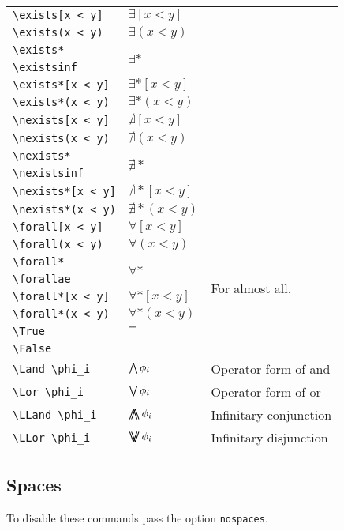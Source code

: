 \documentclass[leqno,11pt]{amsart}
\newcommand{\tab}{\hspace{1cm}}
\begin{document}
\begin{tabular}{l |  l | l}\toprule
	\verb=\exists[x < y]=		& \( \exists[x < y ] \) & \\[6pt]
	\verb=\exists(x < y)=		& \( \exists(x < y ) \) & \\ \midrule
	\verb=\exists*=		& \multirow{2}{*}{\( \exists* \)} & \\[6pt]
	\tab \verb=\existsinf=	&				  & \\[6pt]
	\verb=\exists*[x < y]=		& \( \exists*[x < y ] \) & \\[6pt]
	\verb=\exists*(x < y)=		& \( \exists*(x < y ) \) & \\ \midrule
	\verb=\nexists[x < y]=		& \( \nexists[x < y ] \) & \\[6pt]
	\verb=\nexists(x < y)=		& \( \nexists(x < y ) \) & \\ \midrule
	\verb=\nexists*=		& \multirow{2}{*}{\( \nexists* \)} & \\[6pt]
	\tab \verb=\nexistsinf=	&				  & \\[6pt]
	\verb=\nexists*[x < y]=		& \( \nexists*[x < y ] \) & \\[6pt]
	\verb=\nexists*(x < y)=		& \( \nexists*(x < y ) \) & \\ \midrule
	\verb=\forall[x < y]=		& \( \forall[x < y ] \) & \\[6pt]
	\tab \verb=\forall(x < y)=		& \( \forall(x < y ) \) & \\ \midrule
	\verb=\forall*=		& \multirow{2}{*}{\( \forall* \)} &\multirow{4}{*}{For almost all.} \\
	\tab \verb=\forallae=	&				  & \\[6pt]
	\verb=\forall*[x < y]=		& \( \forall*[x < y ] \) & \\[6pt]
	\verb=\forall*(x < y)=		& \( \forall*(x < y ) \) & \\ \midrule
	\verb=\True=				& \( \top \) & \\ \midrule
	\verb=\False=				& \( \bot \) & \\ \midrule
	\verb=\Land \phi_i=				& \( \mathop{\bigwedge} \phi_i \) & Operator form of and\\ \midrule
	\verb=\Lor \phi_i=				& \( \mathop{\bigvee} \phi_i \) & Operator form of or\\ \midrule
	\verb=\LLand \phi_i=				& \( \mathop{\bigwedge\mkern-15mu\bigwedge} \phi_i \) & Infinitary conjunction\\ \midrule
	\verb=\LLor \phi_i=				& \( \mathop{\bigvee\mkern-15mu\bigvee} \phi_i \) & Infinitary disjunction\\
	\bottomrule
\end{tabular}
\subsection{Spaces}
To disable these commands pass the option \verb=nospaces=.\\  
\end{document}

